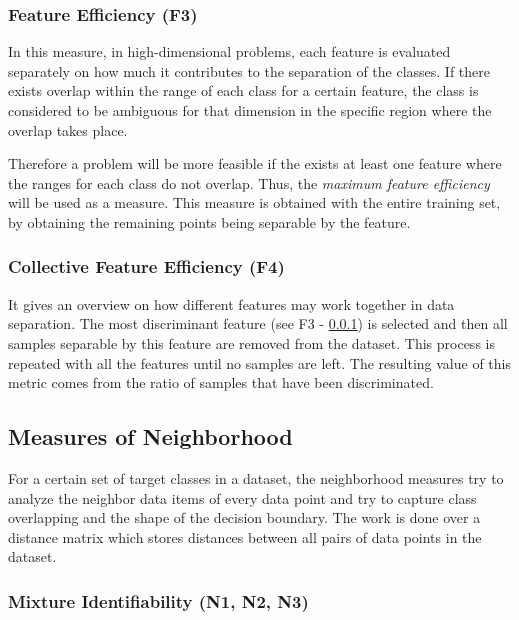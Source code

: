 \subsubsection{Feature Efficiency (F3)}\label{sec:f3}

In this measure, in high-dimensional problems, each feature is evaluated 
separately on how much it contributes to the separation of the classes. If 
there exists overlap within the range of each class for a certain feature, the 
class is considered to be ambiguous for that dimension in the specific region 
where the overlap takes place.

Therefore a problem will be more feasible if the exists at least one feature 
where the ranges for each class do not overlap. Thus, the \textit{maximum 
feature efficiency} will be used as a measure. This measure is obtained with 
the entire training set, by obtaining the remaining points being separable by 
the feature.

\subsubsection{Collective Feature Efficiency (F4)}

It gives an overview on how different features may work together in data 
separation. The most discriminant feature (see F3 - \ref{sec:f3}) is selected 
and then all samples separable by this feature are removed from the dataset.
This process is repeated with all the features until no samples are left.
The resulting value of this metric comes from the ratio of samples that
have been discriminated.

\subsection{Measures of Neighborhood}\label{sec:neighborhood}

For a certain set of target classes in a dataset, the neighborhood measures
try to analyze the neighbor data items of every data point and try to capture
class overlapping and the shape of the decision boundary. The work is done
over a distance matrix which stores distances between all pairs of data points
in the dataset.

\subsubsection{Mixture Identifiability (N1, N2, N3)}

